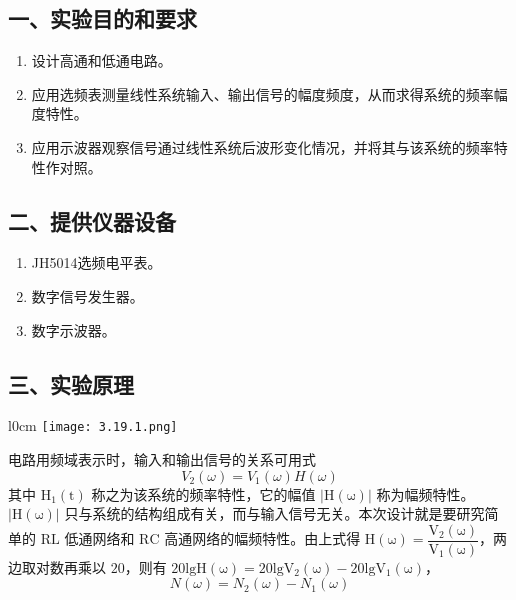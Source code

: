\documentclass[dvipsnames, svgnames,a4paper,11pt]{article}
\begin{document}
\subsection*{一、实验目的和要求}
\begin{enumerate}
	\item 设计高通和低通电路。
	\item 应用选频表测量线性系统输入、输出信号的幅度频度，从而求得系统的频率幅度特性。
	\item 应用示波器观察信号通过线性系统后波形变化情况，并将其与该系统的频率特性作对照。
\end{enumerate}

\subsection*{二、提供仪器设备}
\begin{enumerate}
	\item JH5014选频电平表。
	\item 数字信号发生器。
	\item 数字示波器。
\end{enumerate}


\subsection*{三、实验原理}
\begin{wrapfigure}{l}{0cm} %
	\centering
	\texttt{[image: 3.19.1.png]}
	\caption{}
\end{wrapfigure}
电路用频域表示时，输入和输出信号的关系可用式 
\begin{equation}
  V_2(\omega) = V_1(\omega)H(\omega)
\end{equation}
其中 $\mathrm{H_1(t)}$ 称之为该系统的频率特性，它的幅值 $\mathrm{|H(\omega)|}$ 称为幅频特性。$\mathrm{|H(\omega)|}$ 只与系统的结构组成有关，而与输入信号无关。本次设计就是要研究简单的 $\mathrm{RL}$ 低通网络和 $\mathrm{RC}$ 高通网络的幅频特性。由上式得 $\mathrm{H(\omega) = \dfrac{V_2(\omega)}{V_1(\omega)}}$，两边取对数再乘以 $20$，则有 $\mathrm{20lgH(\omega) = 20lgV_2(\omega) - 20lgV_1(\omega)}$，
\begin{equation}
  N(\omega) = N_2(\omega) - N_1(\omega)
\end{equation}

\begin{figure}[htbp]
	\centering
	\caption{}
\end{figure}
\end{document}
